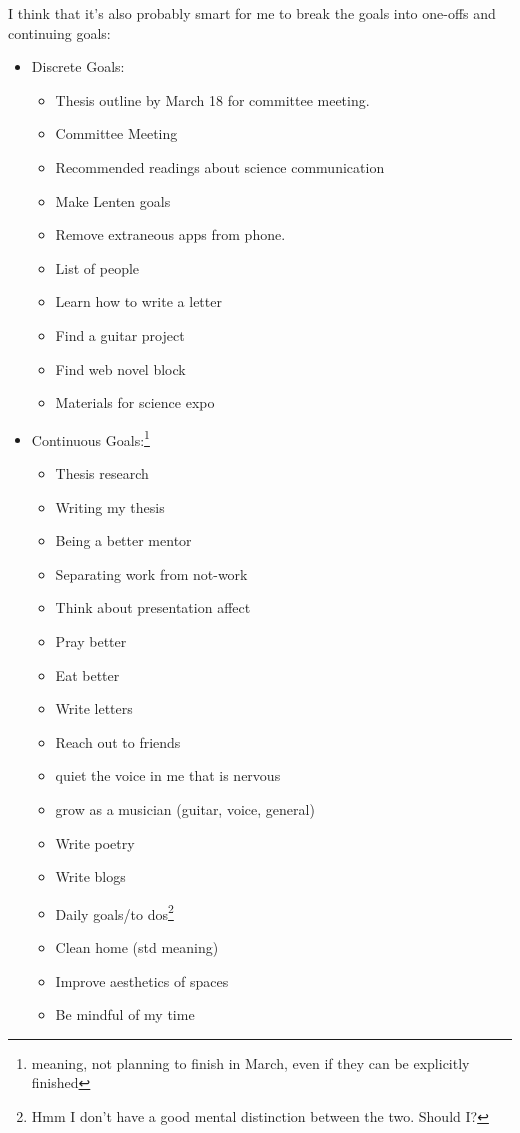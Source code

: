 \documentclass[12pt]{article}[titlepage]
\renewcommand{\,}{\textsuperscript{,}}
\begin{document}
I think that it's also probably smart for me to break the goals into one-offs and continuing goals:  
\begin{itemize}  
\item Discrete Goals:  
\begin{itemize}  
\item Thesis outline by March 18 for committee meeting.  
\item Committee Meeting  
\item Recommended readings about science communication  
\item Make Lenten goals  
\item Remove extraneous apps from phone.  
\item List of people  
\item Learn how to write a letter  
\item Find a guitar project  
\item Find web novel block  
\item Materials for science expo  
\end{itemize}  
\item Continuous Goals:\footnote{meaning, not planning to finish in March, even if they can be explicitly finished}  
\begin{itemize}  
\item Thesis research  
\item Writing my thesis  
\item Being a better mentor  
\item Separating work from not-work  
\item Think about presentation affect  
\item Pray better  
\item Eat better  
\item Write letters  
\item Reach out to friends  
\item quiet the voice in me that is nervous  
\item grow as a musician (guitar, voice, general)  
\item Write poetry  
\item Write blogs  
\item Daily goals/to dos\footnote{Hmm I don't have a good mental distinction between the two. Should I?}  
\item Clean home (std meaning)  
\item Improve aesthetics of spaces  
\item Be mindful of my time  
\end{itemize}  
\end{itemize}
\end{document}

